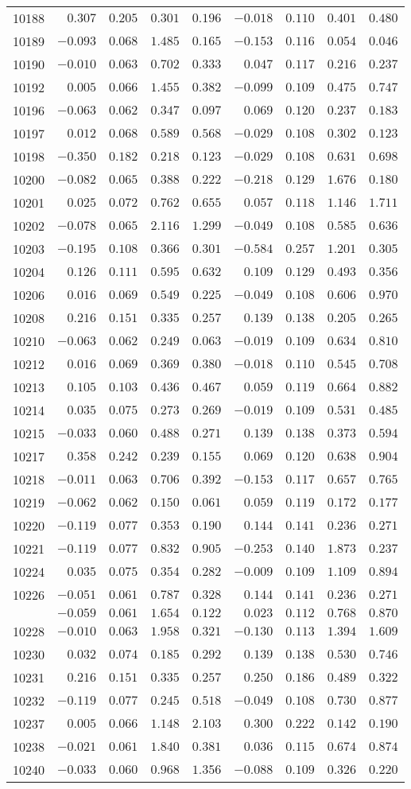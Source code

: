 \documentclass[6pt]{article}
\begin{document}
\begin{landscape}
{\begin{longtable}{lrrrrrrrr}
10188&$ 0.307$&$0.205$&$0.301$&$0.196$&$-0.018$&$0.110$&$0.401$&$0.480$\tabularnewline
10189&$-0.093$&$0.068$&$1.485$&$0.165$&$-0.153$&$0.116$&$0.054$&$0.046$\tabularnewline
10190&$-0.010$&$0.063$&$0.702$&$0.333$&$ 0.047$&$0.117$&$0.216$&$0.237$\tabularnewline
10192&$ 0.005$&$0.066$&$1.455$&$0.382$&$-0.099$&$0.109$&$0.475$&$0.747$\tabularnewline
10196&$-0.063$&$0.062$&$0.347$&$0.097$&$ 0.069$&$0.120$&$0.237$&$0.183$\tabularnewline
10197&$ 0.012$&$0.068$&$0.589$&$0.568$&$-0.029$&$0.108$&$0.302$&$0.123$\tabularnewline
10198&$-0.350$&$0.182$&$0.218$&$0.123$&$-0.029$&$0.108$&$0.631$&$0.698$\tabularnewline
10200&$-0.082$&$0.065$&$0.388$&$0.222$&$-0.218$&$0.129$&$1.676$&$0.180$\tabularnewline
10201&$ 0.025$&$0.072$&$0.762$&$0.655$&$ 0.057$&$0.118$&$1.146$&$1.711$\tabularnewline
10202&$-0.078$&$0.065$&$2.116$&$1.299$&$-0.049$&$0.108$&$0.585$&$0.636$\tabularnewline
10203&$-0.195$&$0.108$&$0.366$&$0.301$&$-0.584$&$0.257$&$1.201$&$0.305$\tabularnewline
10204&$ 0.126$&$0.111$&$0.595$&$0.632$&$ 0.109$&$0.129$&$0.493$&$0.356$\tabularnewline
10206&$ 0.016$&$0.069$&$0.549$&$0.225$&$-0.049$&$0.108$&$0.606$&$0.970$\tabularnewline
10208&$ 0.216$&$0.151$&$0.335$&$0.257$&$ 0.139$&$0.138$&$0.205$&$0.265$\tabularnewline
10210&$-0.063$&$0.062$&$0.249$&$0.063$&$-0.019$&$0.109$&$0.634$&$0.810$\tabularnewline
10212&$ 0.016$&$0.069$&$0.369$&$0.380$&$-0.018$&$0.110$&$0.545$&$0.708$\tabularnewline
10213&$ 0.105$&$0.103$&$0.436$&$0.467$&$ 0.059$&$0.119$&$0.664$&$0.882$\tabularnewline
10214&$ 0.035$&$0.075$&$0.273$&$0.269$&$-0.019$&$0.109$&$0.531$&$0.485$\tabularnewline
10215&$-0.033$&$0.060$&$0.488$&$0.271$&$ 0.139$&$0.138$&$0.373$&$0.594$\tabularnewline
10217&$ 0.358$&$0.242$&$0.239$&$0.155$&$ 0.069$&$0.120$&$0.638$&$0.904$\tabularnewline
10218&$-0.011$&$0.063$&$0.706$&$0.392$&$-0.153$&$0.117$&$0.657$&$0.765$\tabularnewline
10219&$-0.062$&$0.062$&$0.150$&$0.061$&$ 0.059$&$0.119$&$0.172$&$0.177$\tabularnewline
10220&$-0.119$&$0.077$&$0.353$&$0.190$&$ 0.144$&$0.141$&$0.236$&$0.271$\tabularnewline
10221&$-0.119$&$0.077$&$0.832$&$0.905$&$-0.253$&$0.140$&$1.873$&$0.237$\tabularnewline
10224&$ 0.035$&$0.075$&$0.354$&$0.282$&$-0.009$&$0.109$&$1.109$&$0.894$\tabularnewline
10226&$-0.051$&$0.061$&$0.787$&$0.328$&$ 0.144$&$0.141$&$0.236$&$0.271$\tabularnewline
\newpage
10227&$-0.059$&$0.061$&$1.654$&$0.122$&$ 0.023$&$0.112$&$0.768$&$0.870$\tabularnewline
10228&$-0.010$&$0.063$&$1.958$&$0.321$&$-0.130$&$0.113$&$1.394$&$1.609$\tabularnewline
10230&$ 0.032$&$0.074$&$0.185$&$0.292$&$ 0.139$&$0.138$&$0.530$&$0.746$\tabularnewline
10231&$ 0.216$&$0.151$&$0.335$&$0.257$&$ 0.250$&$0.186$&$0.489$&$0.322$\tabularnewline
10232&$-0.119$&$0.077$&$0.245$&$0.518$&$-0.049$&$0.108$&$0.730$&$0.877$\tabularnewline
10237&$ 0.005$&$0.066$&$1.148$&$2.103$&$ 0.300$&$0.222$&$0.142$&$0.190$\tabularnewline
10238&$-0.021$&$0.061$&$1.840$&$0.381$&$ 0.036$&$0.115$&$0.674$&$0.874$\tabularnewline
10240&$-0.033$&$0.060$&$0.968$&$1.356$&$-0.088$&$0.109$&$0.326$&$0.220$\tabularnewline
\hline
\end{longtable}}\end{landscape}
\end{document}
